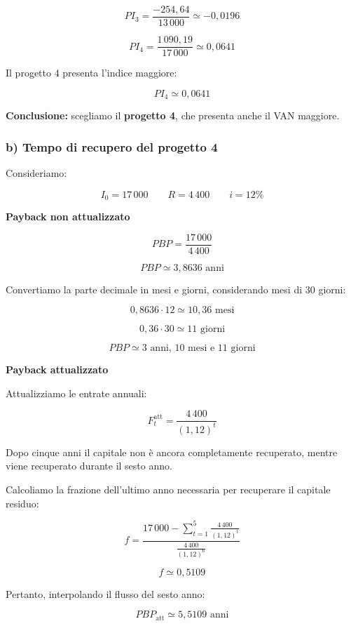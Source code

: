 \[
PI_3=\frac{-254{,}64}{13\,000}\simeq-0{,}0196
\]

\[
PI_4=\frac{1\,090{,}19}{17\,000}\simeq0{,}0641
\]

\noindent Il progetto 4 presenta l'indice maggiore:

\[
\boxed{PI_4\simeq0{,}0641}
\]

\noindent \textbf{Conclusione:} scegliamo il
\textbf{progetto 4}, che presenta anche il VAN maggiore.

\subsubsection*{b) Tempo di recupero del progetto 4}

\noindent Consideriamo:

\[
I_0=17\,000
\qquad
R=4\,400
\qquad
i=12\%
\]

\noindent \textbf{Payback non attualizzato}

\[
PBP=\frac{17\,000}{4\,400}
\]

\[
PBP\simeq3{,}8636\text{ anni}
\]

\noindent Convertiamo la parte decimale in mesi e giorni,
considerando mesi di 30 giorni:

\[
0{,}8636\cdot12\simeq10{,}36\text{ mesi}
\]

\[
0{,}36\cdot30\simeq11\text{ giorni}
\]

\[
\boxed{
PBP\simeq3\text{ anni, }10\text{ mesi e }11\text{ giorni}
}
\]

\medskip

\noindent \textbf{Payback attualizzato}

\noindent Attualizziamo le entrate annuali:

\[
F_t^{\text{att}}=\frac{4\,400}{(1{,}12)^t}
\]

\noindent Dopo cinque anni il capitale non è ancora
completamente recuperato, mentre viene recuperato
durante il sesto anno.

\medskip

\noindent Calcoliamo la frazione dell'ultimo anno necessaria
per recuperare il capitale residuo:

\[
f=
\frac{
17\,000-\displaystyle\sum_{t=1}^{5}
\frac{4\,400}{(1{,}12)^t}
}{
\frac{4\,400}{(1{,}12)^6}
}
\]

\[
f\simeq0{,}5109
\]

\noindent Pertanto, interpolando il flusso del sesto anno:

\[
PBP_{\text{att}}\simeq5{,}5109\text{ anni}
\]

